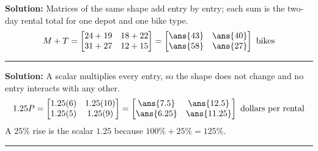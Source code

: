 \documentclass[12pt]{article}
\begin{document}




\textbf{Solution:} Matrices of the same shape add entry by entry; each sum is the two-day
rental total for one depot and one bike type.
\[ M + T = \begin{bmatrix} 24 + 19 & 18 + 22 \\ 31 + 27 & 12 + 15 \end{bmatrix}
        = \begin{bmatrix} \ans{43} & \ans{40} \\ \ans{58} & \ans{27} \end{bmatrix} \text{ bikes} \]

\vspace{0.2cm}\noindent\rule{\linewidth}{0.2pt}


\textbf{Solution:} A scalar multiplies every entry, so the shape does not change and no entry
interacts with any other.
\[ 1.25P = \begin{bmatrix} 1.25(6) & 1.25(10) \\ 1.25(5) & 1.25(9) \end{bmatrix}
        = \begin{bmatrix} \ans{7.5} & \ans{12.5} \\ \ans{6.25} & \ans{11.25} \end{bmatrix} \text{ dollars per rental} \]
A $25\%$ rise is the scalar $1.25$ because $100\% + 25\% = 125\%$.

\vspace{0.2cm}\noindent\rule{\linewidth}{0.2pt}

\end{document}
